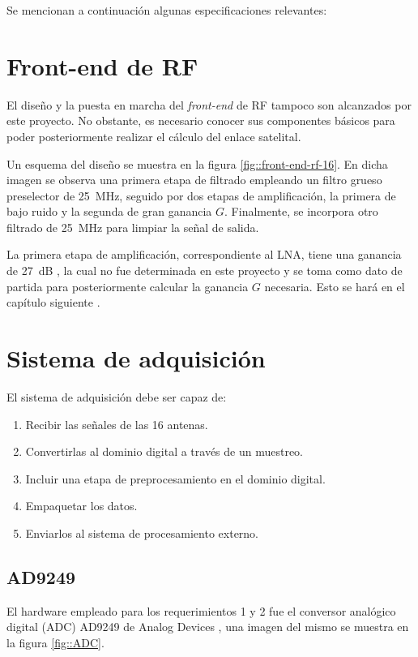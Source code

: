\documentclass[../../main.tex]{subfiles}
\begin{document}
Se mencionan a continuación algunas especificaciones relevantes:



\section{Front-end de RF}
El diseño y la puesta en marcha del \textit{front-end} de RF tampoco son alcanzados por este proyecto. No obstante, es necesario conocer sus componentes básicos para poder posteriormente realizar el cálculo del enlace satelital. 

Un esquema del diseño se muestra en la figura \ref{fig::front-end-rf-16}. En dicha imagen se observa una primera etapa de filtrado empleando un filtro grueso preselector de 25~MHz, seguido por dos etapas de amplificación, la primera de bajo ruido y la segunda de gran ganancia $G$. Finalmente, se incorpora otro filtrado de 25~MHz para limpiar la señal de salida.

La primera etapa de amplificación, correspondiente al LNA, tiene una ganancia de 27~dB , la cual no fue determinada en este proyecto y se toma como dato de partida para posteriormente calcular la ganancia $G$ necesaria. Esto se hará en el capítulo siguiente .


\section{Sistema de adquisición}
El sistema de adquisición debe ser capaz de:
\begin{enumerate}
    \item Recibir las señales de las 16 antenas.
    \item Convertirlas al dominio digital a través de un muestreo.
    \item Incluir una etapa de preprocesamiento en el dominio digital.
    \item Empaquetar los datos.
    \item Enviarlos al sistema de procesamiento externo.
\end{enumerate}

\subsection{AD9249}
El hardware empleado para los requerimientos 1 y 2 fue el conversor analógico digital (ADC) AD9249 de Analog Devices \cite{AD9249}, una imagen del mismo se muestra en la figura \ref{fig::ADC}.
\end{document}
